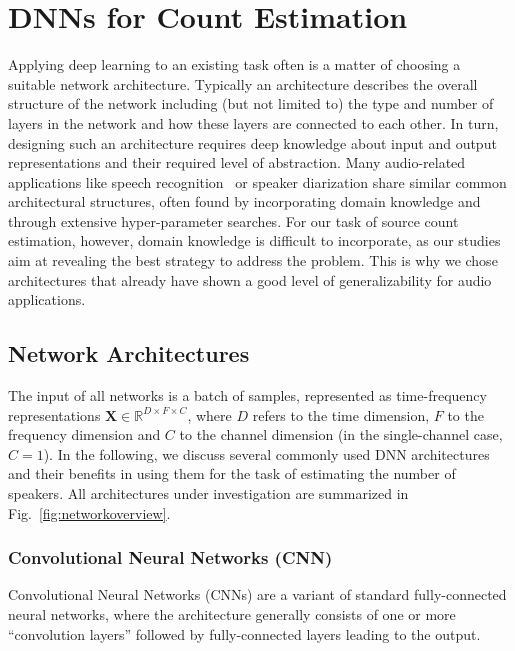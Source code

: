 \section{DNNs for Count Estimation}%
\label{sec:supervised_learning}
Applying deep learning to an existing task often is a matter of choosing a suitable network architecture.
Typically an architecture describes the overall structure of the network including (but not limited to) the type and number of layers in the network and how these layers are connected to each other.
In turn, designing such an architecture requires deep knowledge about input and output representations and their required level of abstraction.
Many audio-related applications like speech recognition~\cite{HintonSpeech} or speaker diarization share similar common architectural structures, often found by incorporating domain knowledge and through extensive hyper-parameter searches.
For our task of source count estimation, however, domain knowledge is difficult to incorporate, as our studies aim at revealing the best strategy to address the problem.
This is why we chose architectures that already have shown a good level of generalizability for audio applications.

\subsection{Network Architectures}
The input of all networks is a batch of samples, represented as time-frequency representations \(\mathbf{X} \in \mathbb{R}^{ D \times F \times C } \), where \(D\) refers to the time dimension, \(F\) to the frequency dimension and \(C\) to the channel dimension (in the single-channel case, \(C=1\)).
In the following, we discuss several commonly used DNN architectures and their benefits in using them for the task of estimating the number of speakers.
All architectures under investigation are summarized in Fig.~\ref{fig:networkoverview}.

\subsubsection{Convolutional Neural Networks (CNN)}%
Convolutional Neural Networks (CNNs) are a variant of standard fully-connected neural networks, where the architecture generally consists of one or more ``convolution layers'' followed by fully-connected layers leading to the output.

